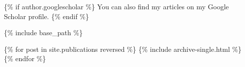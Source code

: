 \{\% if author.googlescholar \%\} You can also find my articles on my
Google Scholar profile. \{\% endif \%\}

\{\% include base\_path \%\}

\{\% for post in site.publications reversed \%\} \{\% include
archive-single.html \%\} \{\% endfor \%\}
